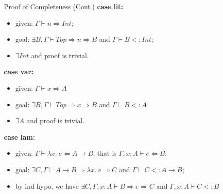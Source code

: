 \begin{frame}{Proof of Completeness (Cont.)}
\textbf{case lit:}
\begin{itemize}
	\item given: $\Gamma \vdash n \Rightarrow Int$;
	\item goal: $\exists B, \Gamma \vdash Top \Rightarrow n \Rightarrow B$ and $\Gamma \vdash B <: Int$;
	\item $\exists Int$ and proof is trivial.
\end{itemize}
\noindent\makebox[\linewidth]{\rule{0.9\paperwidth}{0.4pt}}
\textbf{case var:}
\begin{itemize}
	\item given: $\Gamma \vdash x \Rightarrow A$
	\item goal: $\exists B, \Gamma \vdash Top \Rightarrow x \Rightarrow B$ and $\Gamma \vdash B <: A$
	\item $\exists A$ and proof is trivial.
\end{itemize}
\noindent\makebox[\linewidth]{\rule{0.9\paperwidth}{0.4pt}}
\textbf{case lam:}
\begin{itemize}
	\item given: $\Gamma \vdash \lambda x.~e \Leftarrow A \rightarrow B$; that is $\Gamma, x : A \vdash e \Leftarrow B$;
	\item goal: $\exists C, \Gamma \vdash A \rightarrow B \Rightarrow \lambda x.~e  \Rightarrow C$ and $\Gamma \vdash C <: A \rightarrow B$;
	\item by ind hypo, we have $\exists C, \Gamma, x : A \vdash B \Rightarrow e \Rightarrow C$ and $\Gamma, x : A \vdash C <: B$
\end{itemize}
\end{frame}